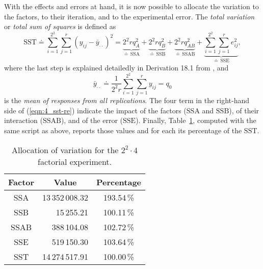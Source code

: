 \documentclass[11pt]{article}
\theoremstyle{definition}
\newcommand\df\doteq
\newcommand\wh[1]{{\color[HTML]{FFFFFF}#1}}
\begin{document}
With the effects and errors at hand, it is now possible to allocate the variation to the factors, to their iteration, and to the experimental error.
The \emph{total variation} or \emph{total sum of squares} is defined as
\begin{equation}
    \label{eqn:4_sst-re}
    \mathrm{SST}\df\sum_{i=1}^{2^2}\sum_{j=1}^r(y_{ij}-\bar y_{\cdot\cdot})^2=\underbrace{2^2rq_A^2}_{\df\,\mathrm{SSA}}+\underbrace{2^2rq_B^2}_{\df\,\mathrm{SSB}}+\underbrace{2^2rq_{AB}^2}_{\df\,\mathrm{SSAB}}+\underbrace{\sum_{i=1}^{2^2}\sum_{j=1}^re_{ij}^2}_{\df\,\mathrm{SSE}},
\end{equation}
where the last step is explained detailedly in Derivation 18.1 from \cite{jain91}, and
\[\bar y_{\cdot\cdot}\df\frac1{2^2r}\sum_{i=1}^{2^2}\sum_{j=1}^ry_{ij}=q_0\]
is the \emph{mean of responses from all replications}.
The four term in the right-hand side of (\ref{eqn:4_sst-re}) indicate the impact of the factors ($\mathrm{SSA}$ and $\mathrm{SSB}$), of their interaction ($\mathrm{SSAB}$), and of the error ($\mathrm{SSE}$).
Finally, Table~\ref{tab:4_impacts-re}, computed with the same script as above, reports those values and for each its percentage of the $\mathrm{SST}$.

\begin{table}[h!]
    \centering
    \small
    {
        \begin{tabular}{|c|r|c|}
            \hline
            \rowcolor{Gray}
            Factor & \multicolumn{1}{c|}{Value} & Percentage \\
            \hline
            \cellcolor{Gray} SSA & 13\,352\,008.32 & \wh{1}93.54\,\% \\
            \cellcolor{Gray} SSB & 15\,255.21 & \wh{10}0.11\,\% \\
            \cellcolor{Gray} SSAB & 388\,104.08 & \wh{10}2.72\,\% \\
            \cellcolor{Gray} SSE & 519\,150.30 & \wh{10}3.64\,\% \\
            \hline
            \cellcolor{Gray} SST & 14\,274\,517.91 & 100.00\,\% \\
            \hline
        \end{tabular}
    }
    \caption{Allocation of variation for the $2^2\cdot4$ factorial experiment.}
    \label{tab:4_impacts-re}
\end{table}
\end{document}
